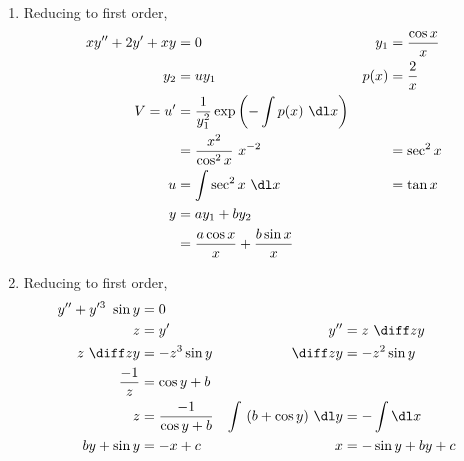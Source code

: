 \begin{enumerate}
    \item Reducing to first order,
          \begin{align}
              xy'' + 2y' + xy & = 0                                                &
              y_{1}           & = \frac{\cos x}{x}                                   \\
              y_{2}           & = uy_{1}                                           &
              p(x)            & = \frac{2}{x}                                        \\
              V = u'          & = \frac{1}{y_{1}^{2}} \exp\left( -\int p(x)\ \dl x
              \right)                                                                \\
                              & = \frac{x^{2}}{\cos ^{2}x}\ x^{-2}                 &
                              & = \sec ^{2}x                                         \\
              u               & = \int \sec ^{2}x\ \dl x                           &
                              & = \tan x                                             \\
              y               & = ay_{1} + by_{2}                                    \\
                              & = \frac{a\cos x}{x} + \frac{b\sin x}{x}
          \end{align}

    \item Reducing to first order,
          \begin{align}
              y'' + y'^{3}\ \sin y      & = 0                      \\
              z                         & = y'                   &
              y''                       & = z\ \diff zy            \\
              z\ \diff zy               & = -z^{3}\sin y         &
              \diff zy                  & = -z^{2}\sin y           \\
              \frac{-1}{z}              & = \cos y + b             \\
              z                         & =\frac{-1}{\cos y + b} &
              \int\ (b + \cos y)\ \dl y & = -\int \dl x            \\
              by + \sin y               & = -x +c                &
              x                         & = -\sin y +by + c
          \end{align}


\end{enumerate}
